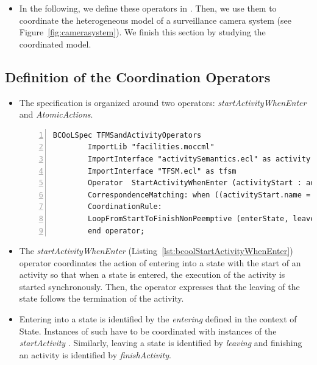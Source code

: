 \begin{itemize}
		\item In the following, we define these operators in \bcool. Then, we use them to coordinate the heterogeneous model of a surveillance camera system (see Figure~\ref{fig:camerasystem}). We finish this section by studying the coordinated model.  


	\end{itemize}
	
	
	\subsection{Definition of the Coordination Operators}
	\begin{itemize}
		\item The \bcool specification is organized around two operators: \emph{startActivityWhenEnter} and \emph{AtomicActions}. 
		
		\begin{lstlisting}[language=bcool,
		caption={Hierarchical operator between TFSM and fUML languages},
		label={lst:bcoolStartActivityWhenEnter}, 
		basicstyle=\scriptsize\ttfamily, backgroundcolor=\color{LGrey}, numbers=left, xleftmargin=2pt]
		BCOoLSpec TFMSandActivityOperators
		ImportLib "facilities.moccml"
		ImportInterface "activitySemantics.ecl" as activity
		ImportInterface "TFSM.ecl" as tfsm
		Operator  StartActivityWhenEnter (activityStart : ad::startActivity , activityStop : ad::finishActivity, enterState : tfsm::entering, leaveState : tfsm::leaving)
		CorrespondenceMatching: when ((activityStart.name = activityStop.name ) and (enterState.name = leaveState.name) and (activityStart.name = enterState.onEnterAction.name));
		CoordinationRule: 
		LoopFromStartToFinishNonPeemptive (enterState, leaveState, activityStart, activityStop)
		end operator;
		\end{lstlisting}
		
		
		\item The \emph{startActivityWhenEnter}  (Listing~\ref{lst:bcoolStartActivityWhenEnter}) operator coordinates the action of entering into a state with the start of an activity so that when a state is entered, the execution of the activity is started synchronously. Then, the operator expresses that the leaving of the state follows the termination of the activity.   
		
		 \item Entering into a state is identified by the \textit{entering} \dse defined in the context of State. Instances of such \dse have to be coordinated with instances of the \textit{startActivity} \dse. Similarly, leaving a state is identified by \dse \textit{leaving} and finishing an activity is identified by \dse \textit{finishActivity}. 
		 

\end{itemize}
